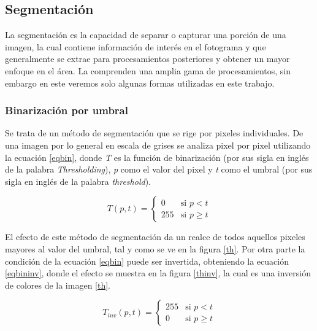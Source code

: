 \documentclass[twoside,spanish,ESP,MSc]{plantillaLabUPV}
\theoremstyle{definition}
\begin{document}
\subsection{Segmentación}
La segmentación es la capacidad de separar o capturar una porción de una imagen, la cual contiene información de interés en el fotograma y que generalmente se extrae para procesamientos posteriores y obtener un mayor enfoque en el área. La comprenden una amplia gama de procesamientos, sin embargo en este veremos solo algunas formas utilizadas en este trabajo.

\subsubsection{Binarización por umbral}
Se trata de un método de segmentación que se rige por pixeles individuales. De una imagen por lo general en escala de grises se analiza pixel por pixel utilizando la ecuación \ref{eqbin}, donde \textit{T} es la función de binarización (por sus sigla en inglés de la palabra \textit{Thresholding}), \textit{p} como el valor del pixel y \textit{t} como el umbral (por sus sigla en inglés de la palabra \textit{threshold}).

\begin{equation}\label{eqbin}
{ T(p,t) = \left \{ \begin{matrix} 0 & \mbox{si }p<t
\\ 255 & \mbox{si } p \geq t\end{matrix}\right. }
\end{equation}

El efecto de este método de segmentación da un realce de todos aquellos pixeles mayores al valor del umbral, tal y como se ve en la figura \ref{th}. Por otra parte la condición de la ecuación \ref{eqbin} puede ser invertida, obteniendo la ecuación \ref{eqbininv}, donde el efecto se muestra en la figura \ref{thinv}, la cual es una inversión de colores de la imagen \ref{th}. 

\begin{equation}\label{eqbininv}
{ T_{inv}(p,t) = \left \{ \begin{matrix} 255 & \mbox{si }p<t
\\ 0 & \mbox{si } p \geq t\end{matrix}\right. }
\end{equation}
\end{document}
